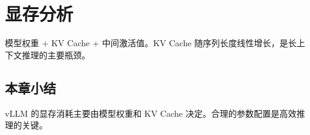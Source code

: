 \section{显存分析}
模型权重 + KV Cache + 中间激活值。KV Cache 随序列长度线性增长，是长上下文推理的主要瓶颈。

\subsection{本章小结}
vLLM 的显存消耗主要由模型权重和 KV Cache 决定。合理的参数配置是高效推理的关键。

